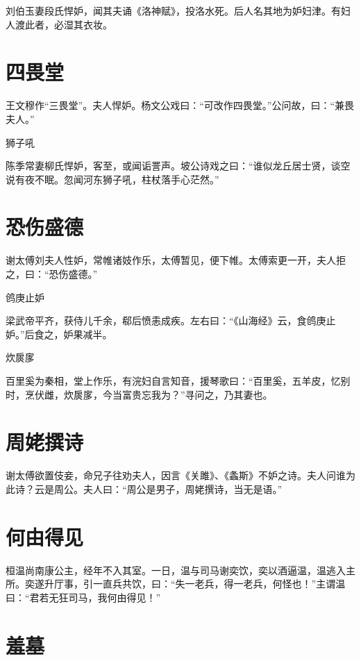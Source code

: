 \documentclass[a4paper,12pt,UTF8,twoside]{ctexbook}
\begin{document}
    刘伯玉妻段氏悍妒，闻其夫诵《洛神赋》，投洛水死。后人名其地为妒妇津。有妇人渡此者，必湿其衣妆。
    
    \section{四畏堂}
    
    王文穆作“三畏堂”。夫人悍妒。杨文公戏曰：“可改作四畏堂。”公问故，曰：“兼畏夫人。”
    
    狮子吼
    
    陈季常妻柳氏悍妒，客至，或闻诟詈声。坡公诗戏之曰：“谁似龙丘居士贤，谈空说有夜不眠。忽闻河东狮子吼，柱杖落手心茫然。”
    
    \section{恐伤盛德}
    
    谢太傅刘夫人性妒，常帷诸妓作乐，太傅暂见，便下帷。太傅索更一开，夫人拒之，曰：“恐伤盛德。”
    
    鸧庚止妒
    
    梁武帝平齐，获侍儿千余，郗后愤恚成疾。左右曰：“《山海经》云，食鸧庚止妒。”后食之，妒果减半。
    
    炊扊扅
    
    百里奚为秦相，堂上作乐，有浣妇自言知音，援琴歌曰：“百里奚，五羊皮，忆别时，烹伏雌，炊扊扅，今当富贵忘我为？”寻问之，乃其妻也。
    
    \section{周姥撰诗}
    
    谢太傅欲置伎妾，命兄子往劝夫人，因言《关雎》、《螽斯》不妒之诗。夫人问谁为此诗？云是周公。夫人曰：“周公是男子，周姥撰诗，当无是语。”
    
    \section{何由得见}
    
    桓温尚南康公主，经年不入其室。一日，温与司马谢奕饮，奕以酒逼温，温逃入主所。奕遂升厅事，引一直兵共饮，曰：“失一老兵，得一老兵，何怪也！”主谓温曰：“君若无狂司马，我何由得见！”
    
    \section{羞墓}
    
\end{document}
